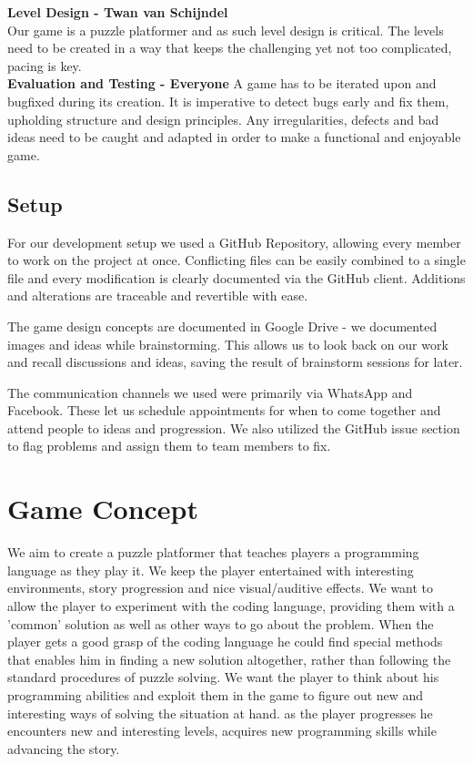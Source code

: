 \documentclass[a4paper,twoside,12pt]{article}
\begin{document}
\textbf{Level Design - Twan van Schijndel} \\
Our game is a puzzle platformer and as such level design is critical. The levels need to be created in a way that keeps the challenging yet not too complicated, pacing is key. \\

\textbf{Evaluation and Testing - Everyone}
A game has to be iterated upon and bugfixed during its creation. It is imperative to detect bugs early and fix them, upholding structure and design principles. Any irregularities, defects and bad ideas need to be caught and adapted in order to make a functional and enjoyable game.\\

\subsection{Setup}

For our development setup we used a GitHub Repository, allowing every member to work on the project at once. Conflicting files can be easily combined to a single file and every modification is clearly documented via the GitHub client. Additions and alterations are traceable and revertible with ease.

The game design concepts are documented in Google Drive - we documented images and ideas while brainstorming. This allows us to look back on our work and recall discussions and ideas, saving the result of brainstorm sessions for later.


The communication channels we used were primarily via WhatsApp and Facebook. These let us schedule appointments for when to come together and attend people to ideas and progression. We also utilized the GitHub issue section to flag problems and assign them to team members to fix.

\section{Game Concept}
We aim to create a puzzle platformer that teaches players a programming language as they play it. We keep the player entertained with interesting environments, story progression and nice visual/auditive effects. We want to allow the player to experiment with the coding language, providing them with a 'common' solution as well as other ways to go about the problem. When the player gets a good grasp of the coding language he could find special methods that enables him in finding a new solution altogether, rather than following the standard procedures of puzzle solving. We want the player to think about his programming abilities and exploit them in the game to figure out new and interesting ways of solving the situation at hand.
as the player progresses he encounters new and interesting levels, acquires new programming skills while advancing the story.
\end{document}
